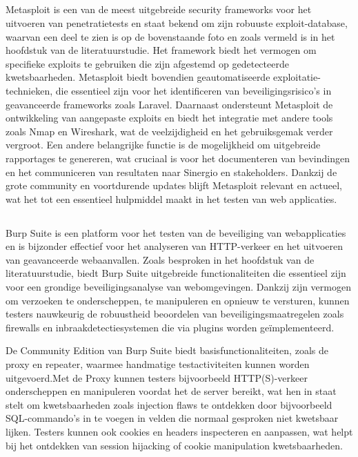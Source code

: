 \subsection{}
Metasploit is een van de meest uitgebreide security frameworks voor het uitvoeren van penetratietests en staat bekend om 
zijn robuuste exploit-database, waarvan een deel te zien is op de bovenstaande foto en zoals vermeld is in het hoofdstuk  van de 
literatuurstudie. Het framework biedt het vermogen om specifieke exploits te gebruiken die zijn afgestemd op gedetecteerde 
kwetsbaarheden. Metasploit biedt bovendien geautomatiseerde exploitatie-technieken, die essentieel zijn voor het identificeren 
van beveiligingsrisico's in geavanceerde frameworks zoals Laravel. Daarnaast ondersteunt Metasploit de ontwikkeling van 
aangepaste exploits en biedt het integratie met andere tools zoals Nmap en Wireshark, wat de veelzijdigheid en het 
gebruiksgemak verder vergroot. Een andere belangrijke functie is de mogelijkheid om uitgebreide rapportages te genereren, 
wat cruciaal is voor het documenteren van bevindingen en het communiceren van resultaten naar Sinergio en stakeholders. Dankzij de grote 
community en voortdurende updates blijft Metasploit relevant en actueel, wat het tot een essentieel hulpmiddel maakt in het 
testen van web applicaties.

\subsection{}
Burp Suite is een platform voor het testen van de beveiliging van webapplicaties en is bijzonder effectief voor 
het analyseren van HTTP-verkeer en het uitvoeren van geavanceerde webaanvallen. Zoals besproken in het hoofdstuk  
van de literatuurstudie, biedt Burp Suite uitgebreide functionaliteiten die essentieel zijn voor een grondige beveiligingsanalyse 
van webomgevingen. Dankzij zijn vermogen om verzoeken te onderscheppen, te manipuleren en opnieuw te versturen, kunnen 
testers nauwkeurig de robuustheid beoordelen van beveiligingsmaatregelen zoals firewalls en inbraakdetectiesystemen die via 
plugins worden geïmplementeerd. 

De Community Edition van Burp Suite biedt basisfunctionaliteiten, zoals de proxy en repeater, 
waarmee handmatige testactiviteiten kunnen worden uitgevoerd.Met de Proxy kunnen testers bijvoorbeeld HTTP(S)-verkeer 
onderscheppen en manipuleren voordat het de server bereikt, wat hen in staat stelt om kwetsbaarheden zoals injection flaws 
te ontdekken door bijvoorbeeld SQL-commando's in te voegen in velden die normaal gesproken niet kwetsbaar lijken. Testers 
kunnen ook cookies en headers inspecteren en aanpassen, wat helpt bij het ontdekken van session hijacking of cookie 
manipulation kwetsbaarheden.

